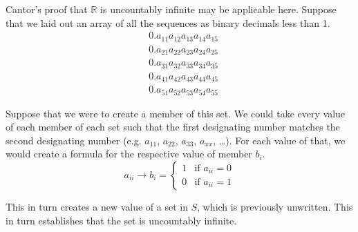 \documentclass[12pt]{report}
\begin{document}
Cantor's proof that $\mathbb{R}$ is uncountably infinite may be applicable here.
Suppose that we laid out an array of all the sequences as binary decimals less than 1.
\begin{align}
    &0.a_{11}a_{12}a_{13}a_{14}a_{15}\\
    &0.a_{21}a_{22}a_{23}a_{24}a_{25}\\
    &0.a_{31}a_{32}a_{33}a_{34}a_{35}\\
    &0.a_{41}a_{42}a_{43}a_{44}a_{45}\\
    &0.a_{51}a_{52}a_{53}a_{54}a_{55}
\end{align}

Suppose that we were to create a member of this set.
We could take every value of each member of each set such that the first designating number matches the second designating number (e.g. $a_{11}$, $a_{22}$, $a_{33}$, $a_{xx}$, \dots). 
For each value of that, we would create a formula for the respective value of member $b_i$.
\begin{equation}
    a_{ii} \to b_i = \begin{cases}
        1   &\text{if } a_{ii} = 0\\
        0   &\text{if } a_{ii} = 1
    \end{cases}
\end{equation}

This in turn creates a new value of a set in $S$, which is previously unwritten.
This in turn establishes that the set is uncountably infinite.
\end{document}
